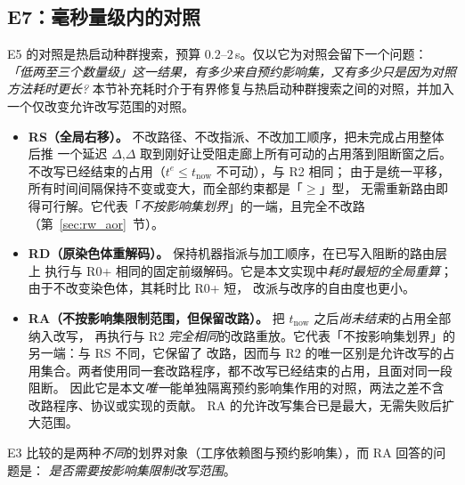 \subsection{E7：毫秒量级内的对照}
\label{sec:cheap}

E5 的对照是热启动种群搜索，预算 \(0.2\)--\(2\)\,s。仅以它为对照会留下一个问题：
\emph{「低两至三个数量级」这一结果，有多少来自预约影响集，又有多少只是因为对照方法耗时更长?}
本节补充耗时介于有界修复与热启动种群搜索之间的对照，并加入一个仅改变允许改写范围的对照。

\begin{itemize}[leftmargin=1.5em,itemsep=0.25em]
\item \textbf{RS（全局右移）。} 不改路径、不改指派、不改加工顺序，把未完成占用整体后推
一个延迟 \(\Delta\),\(\Delta\) 取到刚好让受阻走廊上所有可动的占用落到阻断窗之后。
不改写已经结束的占用（\(t^e\le t_{\mathrm{now}}\) 不可动），与 R2 相同；
由于是统一平移，所有时间间隔保持不变或变大，而全部约束都是「\(\ge\)」型，
无需重新路由即得可行解。它代表「\emph{不按影响集划界}」的一端，且完全不改路
（第~\ref{sec:rw_aor}~节）。
\item \textbf{RD（原染色体重解码）。} 保持机器指派与加工顺序，在已写入阻断的路由层上
执行与 R0+ 相同的固定前缀解码。它是本文实现中\emph{耗时最短的全局重算}；由于不改变染色体，其耗时比 R0+ 短，
改派与改序的自由度也更小。
\item \textbf{RA（不按影响集限制范围，但保留改路）。} 把 \(t_{\mathrm{now}}\) 之后\emph{尚未结束}的占用全部纳入改写，
再执行与 R2 \emph{完全相同}的改路重放。它代表「不按影响集划界」的另一端：与 RS 不同，它保留了
改路，因而与 R2 的唯一区别是允许改写的占用集合。两者使用同一套改路程序，都不改写已经结束的占用，且面对同一段阻断。
因此它是本文\emph{唯一}能单独隔离预约影响集作用的对照，两法之差不含改路程序、协议或实现的贡献。
RA 的允许改写集合已是最大，无需失败后扩大范围。
\end{itemize}

E3 比较的是两种\emph{不同}的划界对象（工序依赖图与预约影响集），而 RA 回答的问题是：
\emph{是否需要按影响集限制改写范围}。

